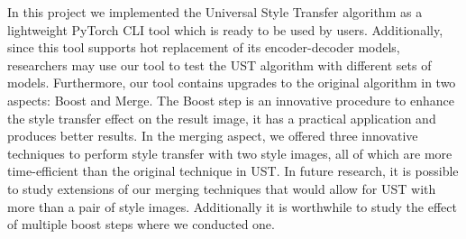 In this project we implemented the Universal Style Transfer algorithm as a lightweight PyTorch CLI tool which is ready to be used by users. Additionally, since this tool supports hot replacement of its encoder-decoder models, researchers may use our tool to test the UST algorithm with different sets of models. Furthermore, our tool contains upgrades to the original algorithm in two aspects: Boost and Merge. The Boost step is an innovative procedure to enhance the style transfer effect on the result image, it has a practical application and produces better results. In the merging aspect, we offered three innovative techniques to perform style transfer with two style images, all of which are more time-efficient than the original technique in UST. In future research, it is possible to study extensions of our merging techniques that would allow for UST with more than a pair of style images. Additionally it is worthwhile to study the effect of multiple boost steps where we conducted one.


